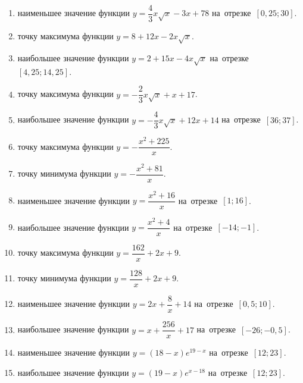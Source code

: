 \documentclass[a4paper,10pt]{article}
\begin{document}
\begin{enumerate}
\item {} наименьшее значение функции $y=\dfrac{4}{3}x\sqrt{x} -3x+78$ на~отрезке~$\left[0,25;30\right]$.

\item {} точку максимума функции $y=8+12x -2x\sqrt{x}$.

\item {} наибольшее значение функции $y=2+15x -4x\sqrt{x}$ на~отрезке~$\left[4,25;14,25\right]$.

\item {} точку максимума функции $y=-\dfrac{2}{3}x\sqrt{x} +x+17$.

\item {} наибольшее значение функции $y=-\dfrac{4}{3}x\sqrt{x} +12x+14$ на~отрезке~$\left[36;37\right]$.

\item {} точку максимума функции $y=-\dfrac{x^2 +225}{x}$.

\item {} точку минимума функции $y=-\dfrac{x^2 +81}{x}$.

\item {} наименьшее значение функции $y=\dfrac{x^2 +16}{x}$ на~отрезке~$\left[1;16\right]$.

\item {} наибольшее значение функции $y=\dfrac{x^2 +4}{x}$ на~отрезке~$\left[-14;-1\right]$.

\item {} точку максимума функции $y=\dfrac{162}{x} +2x+9$.

\item {} точку минимума функции $y=\dfrac{128}{x} +2x+9$.

\item {} наименьшее значение функции $y=2x+\dfrac{8}{x} +14$ на~отрезке~$\left[0,5;10\right]$.

\item {} наибольшее значение функции $y=x+\dfrac{256}{x} +17$ на~отрезке~$\left[-26;-0,5\right]$.

\item {} наименьшее значение функции $y=\left(18-x\right)e^{19-x}$ на~отрезке~$\left[12;23\right]$.

\item {} наибольшее значение функции $y=\left(19-x\right)e^{x-18}$ на~отрезке~$\left[12;23\right]$.


\end{enumerate}
\end{document}
